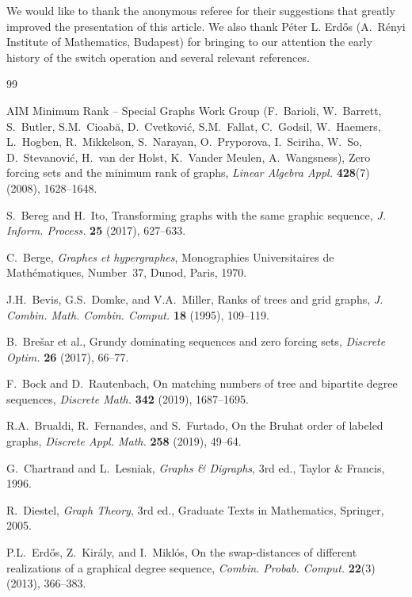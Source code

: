 \documentclass{BICA}
\begin{document}
We would like to thank the anonymous referee for their suggestions that greatly improved the presentation of this article. We also thank P\'eter L. Erd\H{o}s (A.\ R\'enyi Institute of Mathematics, Budapest) for bringing to our attention the early history of the switch operation and several relevant references.


\begin{thebibliography}{99}

AIM Minimum Rank -- Special Graphs Work Group (F.~Barioli, W.~Barrett, S.~Butler,
  S.M.~Cioab\u{a}, D.~Cvetkovi\'c, S.M.~Fallat, C.~Godsil, W.~Haemers, L.~Hogben,
  R.~Mikkelson, S.~Narayan, O.~Pryporova, I.~Sciriha, W.~So, D.~Stevanovi\'c,
  H.~van der Holst, K.~Vander Meulen, A.~Wangsness),
  Zero forcing sets and the minimum rank of graphs,
  \textsl{Linear Algebra Appl.} \textbf{428}(7) (2008), 1628--1648.

S.~Bereg and H.~Ito,
  Transforming graphs with the same graphic sequence,
  \textsl{J. Inform. Process.} \textbf{25} (2017), 627--633.

C.~Berge,
  \textsl{Graphes et hypergraphes},
  Monographies Universitaires de Math\'ematiques, Number~37, Dunod, Paris, 1970.

J.H.~Bevis, G.S.~Domke, and V.A.~Miller,
  Ranks of trees and grid graphs,
  \textsl{J. Combin. Math. Combin. Comput.} \textbf{18} (1995), 109--119.

B.~Bre\v{s}ar et al.,
  Grundy dominating sequences and zero forcing sets,
  \textsl{Discrete Optim.} \textbf{26} (2017), 66--77.

F.~Bock and D.~Rautenbach,
  On matching numbers of tree and bipartite degree sequences,
  \textsl{Discrete Math.} \textbf{342} (2019), 1687--1695.

R.A.~Brualdi, R.~Fernandes, and S.~Furtado,
  On the Bruhat order of labeled graphs,
  \textsl{Discrete Appl. Math.} \textbf{258} (2019), 49--64.

G.~Chartrand and L.~Lesniak,
  \textsl{Graphs \& Digraphs}, 3rd ed.,
  Taylor \& Francis, 1996.

R.~Diestel,
  \textsl{Graph Theory}, 3rd ed.,
  Graduate Texts in Mathematics, Springer, 2005.

P.L.~Erd\H{o}s, Z.~Kir\'aly, and I.~Mikl\'os,
  On the swap-distances of different realizations of a graphical degree sequence,
  \textsl{Combin. Probab. Comput.} \textbf{22}(3) (2013), 366--383.


\end{thebibliography}
\end{document}
